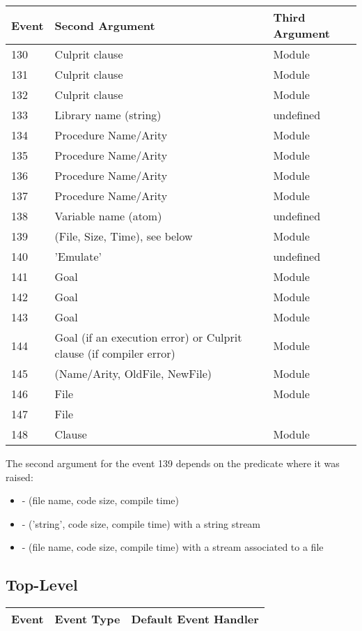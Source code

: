\noindent
\begin{tabular}{p{1.2cm}p{8cm}p{4.5cm}}
{\bf Event} & {\bf Second Argument} & {\bf Third Argument}\\
\hline
130 & Culprit clause & Module \\
131 & Culprit clause & Module \\
132 & Culprit clause & Module \\
133 & Library name (string) & undefined \\
134 & Procedure Name/Arity & Module \\
135 & Procedure Name/Arity & Module \\
136 & Procedure Name/Arity & Module \\
137 & Procedure Name/Arity & Module \\
138 & Variable name (atom) & undefined \\
139 & (File, Size, Time), see below & Module\\
140 & 'Emulate' & undefined \\
141 & Goal & Module \\
142 & Goal & Module \\
143 & Goal & Module \\
144 & Goal (if an execution error) or Culprit clause (if compiler error) & Module \\
145 & (Name/Arity, OldFile, NewFile) & Module \\
146 & File & Module \\
147 & File\\
148 & Clause & Module \\
\hline
\end{tabular}

\newpage
\noindent
The second argument for the event 139 depends on the predicate
where it was raised:
\begin{itemize}
\item {} - (file name, code size, compile time)
\item {} - ('string', code size, compile time) with a string stream
\item {} - (file name, code size, compile time) with a stream associated to a file
\end{itemize}

\subsection{Top-Level}
\begin{tabular}{|p{1.2cm}p{8cm}p{4.5cm}|}
\hline
{\bf Event} & {\bf Event Type} & {\bf Default Event Handler}\\
\hline

\hline
\end{tabular}

